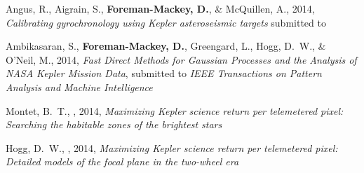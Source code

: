 \item Angus, R., Aigrain, S., {\bf Foreman-Mackey, D.}, \& McQuillen, A., 2014,
    \emph{Calibrating gyrochronology using Kepler asteroseismic targets}
    submitted to \mnras

\item Ambikasaran, S., {\bf Foreman-Mackey, D.}, Greengard, L., Hogg, D.~W.,
    \& O'Neil, M., 2014,
    \emph{Fast Direct Methods for Gaussian Processes and the Analysis of NASA
          Kepler Mission Data},
    submitted to \emph{IEEE Transactions on Pattern Analysis and Machine
        Intelligence}

\item Montet, B.~T., \etal, 2014,
    \emph{Maximizing Kepler science return per telemetered pixel: Searching
          the habitable zones of the brightest stars}

\item Hogg, D.~W., \etal, 2014,
    \emph{Maximizing Kepler science return per telemetered pixel: Detailed
          models of the focal plane in the two-wheel era}
